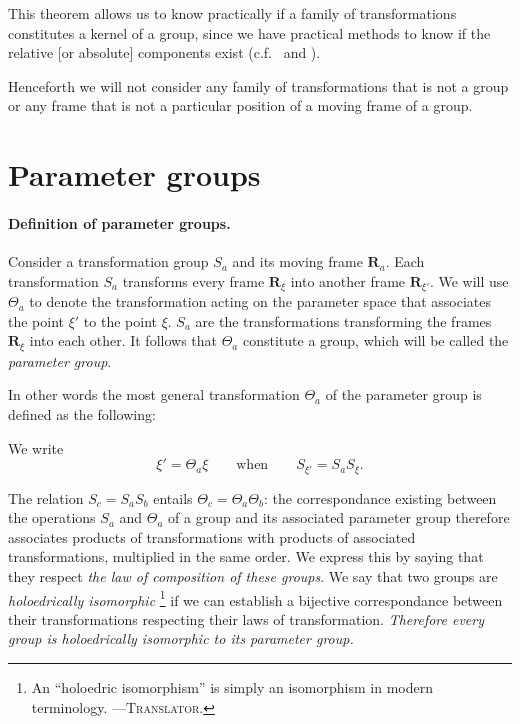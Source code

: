 \somespace

This theorem allows us to know practically if a family of transformations constitutes a kernel of a group, since we have practical methods to know if the relative [or absolute] components exist (c.f.~ and ).

Henceforth we will not consider any family of transformations that is not a group or any frame that is not a particular position of a moving frame of a group.

\section{Parameter groups}
\label{sec:parameter-groups}
\paragraph{Definition of parameter groups.}
\label{sec:79}
Consider a transformation group $S_{a}$ and its moving frame $\mathbf{R}_{a}$. Each transformation $S_{a}$ transforms every frame $\mathbf{R}_{\xi}$ into another frame $\mathbf{R}_{\xi'}$. We will use $\Theta_{a}$ to denote the transformation acting on the parameter space that associates the point $\xi'$ to the point $\xi$. $S_{a}$ are the transformations transforming the frames $\mathbf{R}_{\xi}$ into each other. It follows that $\Theta_{a}$ constitute a group, which will be called the \emph{parameter group}.

In other words the most general transformation $\Theta_{a}$ of the parameter group is defined as the following:

We write
\begin{equation}
  \label{eq:5.25}
  \xi'=\Theta_{a}\xi\qquad\text{when}\qquad S_{\xi'}=S_{a}S_{\xi}.
\end{equation}

The relation $S_{c}=S_{a}S_{b}$ entails $\Theta_{c}=\Theta_{a}\Theta_{b}$: the correspondance existing between the operations $S_{a}$ and $\Theta_{a}$ of a group and its associated parameter group therefore associates products of transformations with products of associated transformations, multiplied in the same order. We express this by saying that they respect \emph{the law of composition of these groups}. We say that two groups are \emph{holoedrically isomorphic} \footnote{An ``holoedric isomorphism'' is simply an isomorphism in modern terminology. ---\textsc{Translator}.} if we can establish a bijective correspondance between their transformations respecting their laws of transformation. \emph{Therefore every group is holoedrically isomorphic to its parameter group.}

